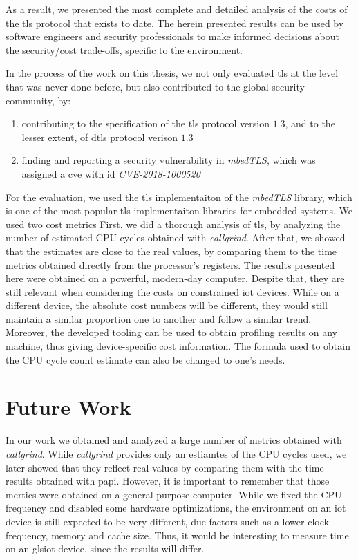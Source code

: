 As a result, we presented the most complete and detailed analysis of the costs of the \gls{tls} protocol that exists to date.
The herein presented results can be used by software engineers and security professionals to make informed decisions about the security/cost trade-offs,
specific to the environment.

In the process of the work on this thesis, we not only evaluated \gls{tls} at the level that was never done before, 
but also contributed to the global security community, by:

\begin{enumerate}
    \item contributing to the specification of the \gls{tls} protocol version $1.3$, and to the lesser extent, of \gls{dtls} protocol verison $1.3$
    \item finding and reporting a security vulnerability in \textit{mbedTLS}, which was assigned a \gls{cve} with id \textit{CVE-2018-1000520}
\end{enumerate}

For the evaluation,
we used the \gls{tls} implementaiton of the \textit{mbedTLS} library, which is one of the most
popular \gls{tls} implementaiton libraries for embedded systems. We used two cost metrics
First, we did a thorough analysis of \gls{tls}, by analyzing the number of estimated CPU cycles obtained with \textit{callgrind}.
After that, we showed that the estimates are close to the real values, by comparing them to the time metrics obtained directly from
the processor's registers. The results presented here were obtained on a powerful, modern-day computer. Despite that, they are still
relevant when considering the costs on constrained \gls{iot} devices. While on a different device, the absolute cost 
numbers will be different, they would still maintain a similar proportion one to another and follow a similar trend.
Moreover, the developed tooling can be used to obtain profiling results on any machine, thus giving device-specific 
cost information. The formula used to obtain the CPU cycle count estimate can also be changed to one's needs.

\section{Future Work}

In our work we obtained and analyzed a large number of metrics obtained with \textit{callgrind}. While \textit{callgrind}
provides only an estiamtes of the CPU cycles used, we later showed  that they reflect real values by comparing them with the
time results obtained with \gls{papi}. However, it is important to remember that those mertics were obtained on a general-purpose
computer. While we fixed the CPU frequency and disabled some hardware optimizations, the environment on an \gls{iot} device is still
expected to be very different, due factors such as a lower clock frequency, memory and cache size. Thus, it would be interesting to 
measure time on an gls{iot} device, since the results will differ.

